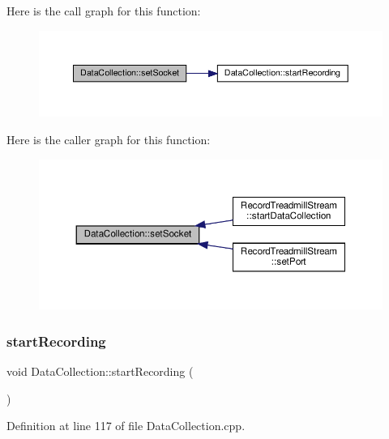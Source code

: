Here is the call graph for this function\+:
\nopagebreak
\begin{figure}[H]
\begin{center}
\leavevmode
\includegraphics[width=350pt]{class_data_collection_a340ae86497b8b0f29d4911cf7dc8d0da_cgraph}
\end{center}
\end{figure}
Here is the caller graph for this function\+:
\nopagebreak
\begin{figure}[H]
\begin{center}
\leavevmode
\includegraphics[width=350pt]{class_data_collection_a340ae86497b8b0f29d4911cf7dc8d0da_icgraph}
\end{center}
\end{figure}
\mbox{\label{class_data_collection_ae8d0c9f26d1ea90c725d5de873773da1}} 
\subsubsection{\texorpdfstring{start\+Recording}{startRecording}}
{\footnotesize\ttfamily void Data\+Collection\+::start\+Recording (\begin{DoxyParamCaption}{ }\end{DoxyParamCaption})\hspace{0.3cm}{\ttfamily [slot]}}



Definition at line 117 of file Data\+Collection.\+cpp.

